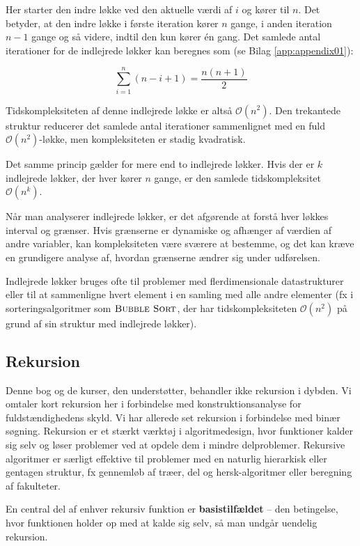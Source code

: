 Her starter den indre løkke ved den aktuelle værdi af $i$ og kører til $n$. Det betyder, at den indre løkke i første iteration kører $n$ gange, i anden iteration $n-1$ gange og så videre, indtil den kun kører én gang. Det samlede antal iterationer for de indlejrede løkker kan beregnes som (se Bilag \ref{app:appendix01}):

\[
\sum_{i=1}^{n} (n - i + 1) = \frac{n (n + 1)}{2}
\]

Tidskompleksiteten af denne indlejrede løkke er altså $\mathcal{O}(n^2)$. Den trekantede struktur reducerer det samlede antal iterationer sammenlignet med en fuld $\mathcal{O}(n^2)$-løkke, men kompleksiteten er stadig kvadratisk.

Det samme princip gælder for mere end to indlejrede løkker. Hvis der er $k$ indlejrede løkker, der hver kører $n$ gange, er den samlede tidskompleksitet $\mathcal{O}(n^k)$.

Når man analyserer indlejrede løkker, er det afgørende at forstå hver løkkes interval og grænser. Hvis grænserne er dynamiske og afhænger af værdien af andre variabler, kan kompleksiteten være sværere at bestemme, og det kan kræve en grundigere analyse af, hvordan grænserne ændrer sig under udførelsen.

Indlejrede løkker bruges ofte til problemer med flerdimensionale datastrukturer eller til at sammenligne hvert element i en samling med alle andre elementer (fx i sorteringsalgoritmer som $\proc{Bubble Sort}$, der har tidskompleksiteten $\mathcal{O}(n^2)$ på grund af sin struktur med indlejrede løkker).

\subsection*{Rekursion}
Denne bog og de kurser, den understøtter, behandler ikke rekursion i dybden. Vi omtaler kort rekursion her i forbindelse med konstruktionsanalyse for fuldstændighedens skyld. Vi har allerede set rekursion i forbindelse med binær søgning. Rekursion er et stærkt værktøj i algoritmedesign, hvor funktioner kalder sig selv og løser problemer ved at opdele dem i mindre delproblemer. Rekursive algoritmer er særligt effektive til problemer med en naturlig hierarkisk eller gentagen struktur, fx gennemløb af træer, del og hersk-algoritmer eller beregning af fakulteter.

En central del af enhver rekursiv funktion er \textbf{basistilfældet} -- den betingelse, hvor funktionen holder op med at kalde sig selv, så man undgår uendelig rekursion.

